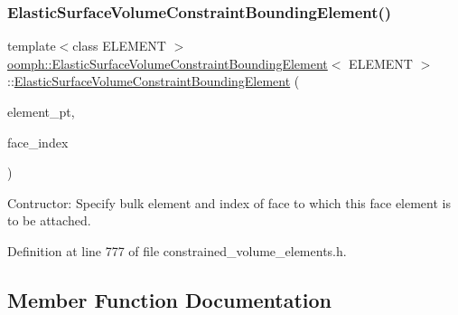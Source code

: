 \subsubsection{\texorpdfstring{Elastic\+Surface\+Volume\+Constraint\+Bounding\+Element()}{ElasticSurfaceVolumeConstraintBoundingElement()}}
{\footnotesize\ttfamily template$<$class E\+L\+E\+M\+E\+NT $>$ \\
\hyperlink{classoomph_1_1ElasticSurfaceVolumeConstraintBoundingElement}{oomph\+::\+Elastic\+Surface\+Volume\+Constraint\+Bounding\+Element}$<$ E\+L\+E\+M\+E\+NT $>$\+::\hyperlink{classoomph_1_1ElasticSurfaceVolumeConstraintBoundingElement}{Elastic\+Surface\+Volume\+Constraint\+Bounding\+Element} (\begin{DoxyParamCaption}\item[{Finite\+Element $\ast$const \&}]{element\+\_\+pt,  }\item[{const int \&}]{face\+\_\+index }\end{DoxyParamCaption})\hspace{0.3cm}{\ttfamily [inline]}}



Contructor\+: Specify bulk element and index of face to which this face element is to be attached. 



Definition at line 777 of file constrained\+\_\+volume\+\_\+elements.\+h.



\subsection{Member Function Documentation}
\mbox{\label{classoomph_1_1ElasticSurfaceVolumeConstraintBoundingElement_a16addc228d9871f22cd9eaf9b581ff5c}} 
